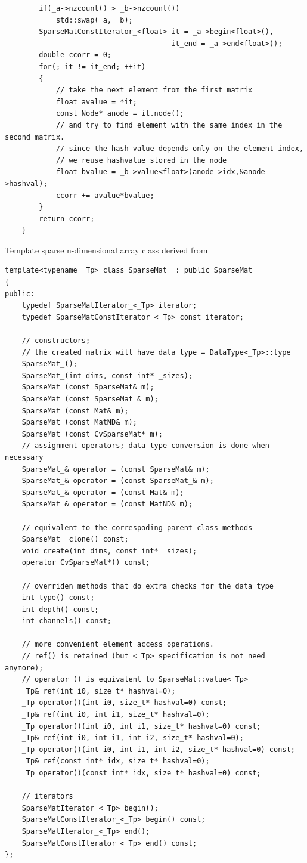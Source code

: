 \begin{enumerate}
\begin{lstlisting}
        if(_a->nzcount() > _b->nzcount())
            std::swap(_a, _b);
        SparseMatConstIterator_<float> it = _a->begin<float>(),
                                       it_end = _a->end<float>();
        double ccorr = 0;
        for(; it != it_end; ++it)
        {
            // take the next element from the first matrix
            float avalue = *it;
            const Node* anode = it.node();
            // and try to find element with the same index in the second matrix.
            // since the hash value depends only on the element index,
            // we reuse hashvalue stored in the node
            float bvalue = _b->value<float>(anode->idx,&anode->hashval);
            ccorr += avalue*bvalue;
        }
        return ccorr;
    }
    \end{lstlisting}
\end{enumerate}

Template sparse n-dimensional array class derived from 

\begin{lstlisting}
template<typename _Tp> class SparseMat_ : public SparseMat
{
public:
    typedef SparseMatIterator_<_Tp> iterator;
    typedef SparseMatConstIterator_<_Tp> const_iterator;

    // constructors;
    // the created matrix will have data type = DataType<_Tp>::type
    SparseMat_();
    SparseMat_(int dims, const int* _sizes);
    SparseMat_(const SparseMat& m);
    SparseMat_(const SparseMat_& m);
    SparseMat_(const Mat& m);
    SparseMat_(const MatND& m);
    SparseMat_(const CvSparseMat* m);
    // assignment operators; data type conversion is done when necessary
    SparseMat_& operator = (const SparseMat& m);
    SparseMat_& operator = (const SparseMat_& m);
    SparseMat_& operator = (const Mat& m);
    SparseMat_& operator = (const MatND& m);

    // equivalent to the correspoding parent class methods
    SparseMat_ clone() const;
    void create(int dims, const int* _sizes);
    operator CvSparseMat*() const;

    // overriden methods that do extra checks for the data type
    int type() const;
    int depth() const;
    int channels() const;
    
    // more convenient element access operations.
    // ref() is retained (but <_Tp> specification is not need anymore);
    // operator () is equivalent to SparseMat::value<_Tp>
    _Tp& ref(int i0, size_t* hashval=0);
    _Tp operator()(int i0, size_t* hashval=0) const;
    _Tp& ref(int i0, int i1, size_t* hashval=0);
    _Tp operator()(int i0, int i1, size_t* hashval=0) const;
    _Tp& ref(int i0, int i1, int i2, size_t* hashval=0);
    _Tp operator()(int i0, int i1, int i2, size_t* hashval=0) const;
    _Tp& ref(const int* idx, size_t* hashval=0);
    _Tp operator()(const int* idx, size_t* hashval=0) const;

    // iterators
    SparseMatIterator_<_Tp> begin();
    SparseMatConstIterator_<_Tp> begin() const;
    SparseMatIterator_<_Tp> end();
    SparseMatConstIterator_<_Tp> end() const;
};
\end{lstlisting}

